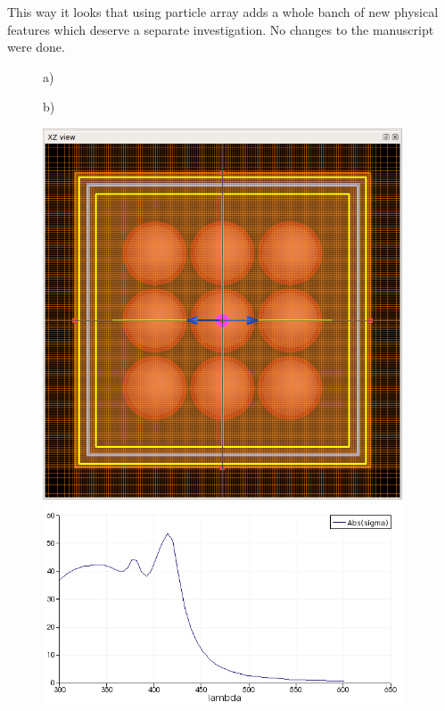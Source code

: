 \documentclass[a4paper]{article}
\begin{document}
This way it looks that using particle array adds a whole banch of new
physical features which deserve a separate investigation. No changes
to the manuscript were done.
\begin{figure}
  \begin{minipage}[h]{0.49\textwidth}    \begin{flushleft}     a)    \end{flushleft}
  \end{minipage}
  \begin{minipage}[h]{0.49\textwidth}    \begin{flushleft}     b)    \end{flushleft}
  \end{minipage}
  \begin{minipage}[h]{0.49\textwidth} 
   \includegraphics[width=0.95\textwidth]{fdtd-3x3}
  \end{minipage}
  \begin{minipage}[h]{0.49\textwidth} 
   \includegraphics[width=0.95\textwidth]{fdtd-spectra-3x3}

\end{minipage}
\end{figure}
\end{document}

